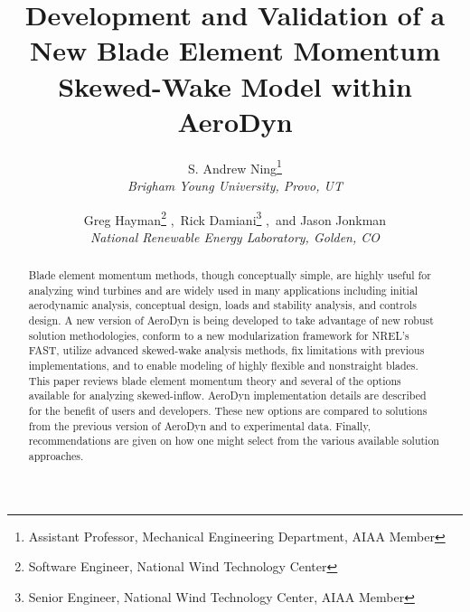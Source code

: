 \documentclass[]{aiaa-tc}%
\title{Development and Validation of a New Blade Element Momentum Skewed-Wake Model within AeroDyn}
\author{
  S. Andrew Ning\thanks{Assistant Professor, Mechanical Engineering Department, AIAA Member}\\
  {\normalsize\itshape
   \hspace*{1in}Brigham Young University, Provo, UT\hspace*{1in}}\\
  \and
  Greg Hayman\thanks{Software Engineer, National Wind Technology Center}
  ,\ Rick Damiani\thanks{Senior Engineer, National Wind Technology Center, AIAA Member}
  ,\ and Jason Jonkman\thanksibid{3}\\
  {\normalsize\itshape
   National Renewable Energy Laboratory, Golden, CO}
 }
\begin{document}
\maketitle


\begin{abstract}
Blade element momentum methods, though conceptually simple, are highly useful for analyzing wind turbines and are widely used in many applications including initial aerodynamic analysis, conceptual design, loads and stability analysis, and controls design.  A new version of AeroDyn is being developed to take advantage of new robust solution methodologies, conform to a new modularization framework for NREL's FAST, utilize advanced skewed-wake analysis methods, fix limitations with previous implementations, and to enable modeling of highly flexible and nonstraight blades.  This paper reviews blade element momentum theory and several of the options available for analyzing skewed-inflow.  AeroDyn implementation details are described for the benefit of users and developers.  These new options are compared to solutions from the previous version of AeroDyn and to experimental data.  Finally, recommendations are given on how one might select from the various available solution approaches.
\end{abstract}

\printnomenclature[1cm]
\end{document}
